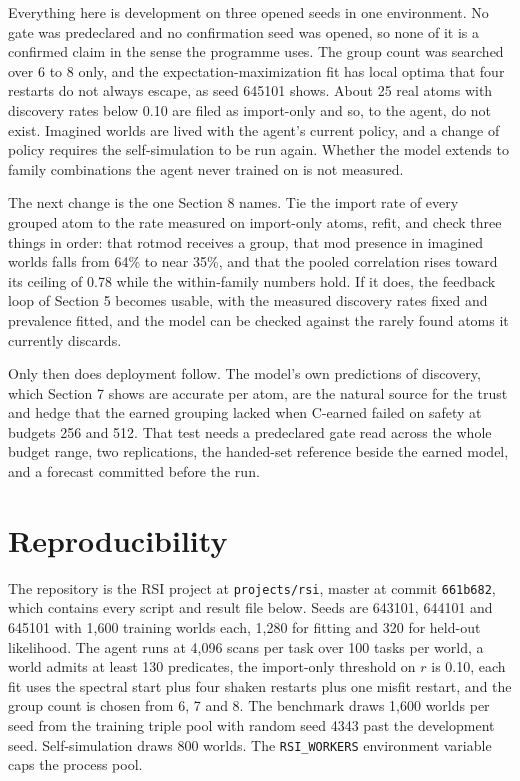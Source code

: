 \documentclass[11pt]{article}
\begin{document}
Everything here is development on three opened seeds in one environment. No gate was predeclared and no confirmation seed was opened, so none of it is a confirmed claim in the sense the programme uses. The group count was searched over 6 to 8 only, and the expectation-maximization fit has local optima that four restarts do not always escape, as seed 645101 shows. About 25 real atoms with discovery rates below 0.10 are filed as import-only and so, to the agent, do not exist. Imagined worlds are lived with the agent's current policy, and a change of policy requires the self-simulation to be run again. Whether the model extends to family combinations the agent never trained on is not measured.

The next change is the one Section 8 names. Tie the import rate of every grouped atom to the rate measured on import-only atoms, refit, and check three things in order: that rotmod receives a group, that mod presence in imagined worlds falls from 64\% to near 35\%, and that the pooled correlation rises toward its ceiling of 0.78 while the within-family numbers hold. If it does, the feedback loop of Section 5 becomes usable, with the measured discovery rates fixed and prevalence fitted, and the model can be checked against the rarely found atoms it currently discards.

Only then does deployment follow. The model's own predictions of discovery, which Section 7 shows are accurate per atom, are the natural source for the trust and hedge that the earned grouping lacked when C-earned failed on safety at budgets 256 and 512. That test needs a predeclared gate read across the whole budget range, two replications, the handed-set reference beside the earned model, and a forecast committed before the run.

\section{Reproducibility}

The repository is the RSI project at \texttt{projects/rsi}, master at commit \texttt{661b682}, which contains every script and result file below. Seeds are 643101, 644101 and 645101 with 1,600 training worlds each, 1,280 for fitting and 320 for held-out likelihood. The agent runs at 4,096 scans per task over 100 tasks per world, a world admits at least 130 predicates, the import-only threshold on $r$ is 0.10, each fit uses the spectral start plus four shaken restarts plus one misfit restart, and the group count is chosen from 6, 7 and 8. The benchmark draws 1,600 worlds per seed from the training triple pool with random seed 4343 past the development seed. Self-simulation draws 800 worlds. The \texttt{RSI\_WORKERS} environment variable caps the process pool.
\end{document}

